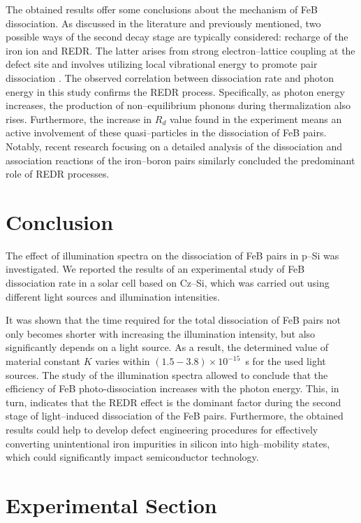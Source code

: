 \documentclass{WileyMSP-template}
\begin{document}
The obtained results offer some conclusions about the mechanism of FeB dissociation.
As discussed in the literature and previously mentioned, two possible ways of the second decay stage
are typically considered: recharge of the iron ion and REDR.
The latter arises from strong electron--lattice coupling at the defect site and involves utilizing local vibrational energy to promote pair dissociation
\cite{FeBAssJAP2014,Sun2021,Macdonald2004}.
The observed correlation between dissociation rate and photon energy in this study confirms the REDR process.
Specifically, as photon energy increases, the production of non--equilibrium phonons during thermalization also rises.
Furthermore, the increase in $R_d$ value found in the experiment means an active involvement of these quasi--particles in the dissociation of FeB pairs.
Notably, recent research \cite{Sun2021} focusing on a detailed analysis of the dissociation and association reactions of the iron--boron pairs similarly concluded the predominant role of REDR processes.



\section{Conclusion}\label{SecConsl}

The effect of illumination spectra on the dissociation of
FeB pairs in p--Si was investigated.
We reported the results of an experimental study of FeB dissociation rate in a solar cell based on Cz--Si,
which was carried out using different light sources and illumination intensities.


It was shown that the time required for the total dissociation of FeB pairs
not only becomes shorter with increasing the illumination intensity, but also significantly depends
on a light source.
As a result, the determined value of material constant $K$  varies within
$(1.5-3.8)\times10^{-15}$~s
for the used light sources.
The study of the illumination spectra allowed to conclude that the efficiency of FeB photo-dissociation increases with the photon energy.
This, in turn, indicates that
the REDR effect is the dominant factor during the second stage of light--induced dissociation of the FeB pairs.
Furthermore, the obtained results could help to develop defect engineering procedures
for effectively converting unintentional iron impurities in silicon into high--mobility states,
which could significantly impact semiconductor technology.


\section{Experimental Section}
\label{SecExp}
\end{document}
